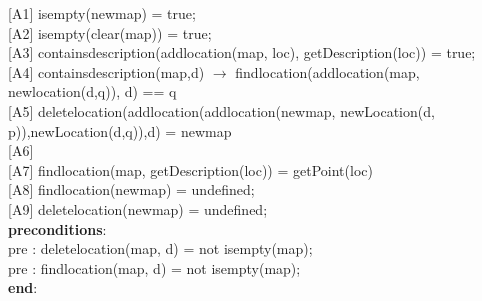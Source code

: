 \documentclass[12pt]{article}
\begin{document}
\begin{spacing}{1.5}
\hspace*{5mm} [A1] isempty(newmap) = true;\\
\hspace*{5mm} [A2] isempty(clear(map)) = true;\\
\hspace*{5mm} [A3] containsdescription(addlocation(map, loc), getDescription(loc)) = true;\\
\hspace*{5mm} [A4] containsdescription(map,d) $\rightarrow$ findlocation(addlocation(map, newlocation(d,q)), d) == q \\
\hspace*{5mm} [A5] deletelocation(addlocation(addlocation(newmap, newLocation(d, p)),newLocation(d,q)),d) = newmap\\
\hspace*{5mm} [A6] \\
\hspace*{5mm} [A7] findlocation(map, getDescription(loc)) = getPoint(loc)\\
\hspace*{5mm} [A8] findlocation(newmap) = undefined;\\
\hspace*{5mm} [A9] deletelocation(newmap) = undefined;\\
\hspace*{5mm} \textbf{preconditions}:\\
\hspace*{10mm} pre : deletelocation(map, d) = not isempty(map);\\
\hspace*{10mm} pre : findlocation(map, d) = not isempty(map);\\
\hspace*{5mm} \textbf{end}:\\

\end{spacing}
\end{document}
